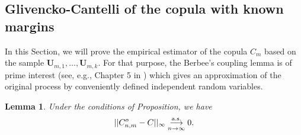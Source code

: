 \documentclass[11pt]{article}
\newtheorem{lemma}{Lemma}
\theoremstyle{definition}
\begin{document}
	\subsection{Glivencko-Cantelli of the copula with known margins}
	
	In this Section, we will prove the empirical estimator of the copula $C_m$ based on the sample $\textbf{U}_{m,1},\dots, \textbf{U}_{m,k}$. For that purpose, the Berbee's coupling lemma is of prime interest (see, e.g., Chapter 5 in \cite{rio2017asymptotic}) which gives an approximation of the original process by conveniently defined independent random variables.
	
	\begin{lemma}
	\label{lem:gc}
		Under the conditions of Proposition, we have
		\begin{equation*}
			||C_{n,m}^o - C ||_{\infty} \overunderset{\textrm{a.s.}}{n \rightarrow \infty}{\longrightarrow} 0.
		\end{equation*}
	\end{lemma}
\end{document}
